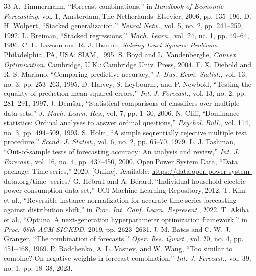 \documentclass[journal]{IEEEtran}
\begin{document}
\begin{thebibliography}{33}
 A. Timmermann, ``Forecast combinations,'' in \emph{Handbook of Economic Forecasting}, vol. 1, Amsterdam, The Netherlands: Elsevier, 2006, pp. 135--196.
 D. H. Wolpert, ``Stacked generalization,'' \emph{Neural Netw.}, vol. 5, no. 2, pp. 241--259, 1992.
 L. Breiman, ``Stacked regressions,'' \emph{Mach. Learn.}, vol. 24, no. 1, pp. 49--64, 1996.
 C. L. Lawson and R. J. Hanson, \emph{Solving Least Squares Problems}. Philadelphia, PA, USA: SIAM, 1995.
 S. Boyd and L. Vandenberghe, \emph{Convex Optimization}. Cambridge, U.K.: Cambridge Univ. Press, 2004.
 F. X. Diebold and R. S. Mariano, ``Comparing predictive accuracy,'' \emph{J. Bus. Econ. Statist.}, vol. 13, no. 3, pp. 253--263, 1995.
 D. Harvey, S. Leybourne, and P. Newbold, ``Testing the equality of prediction mean squared errors,'' \emph{Int. J. Forecast.}, vol. 13, no. 2, pp. 281--291, 1997.
 J. Dem\v{s}ar, ``Statistical comparisons of classifiers over multiple data sets,'' \emph{J. Mach. Learn. Res.}, vol. 7, pp. 1--30, 2006.
 N. Cliff, ``Dominance statistics: Ordinal analyses to answer ordinal questions,'' \emph{Psychol. Bull.}, vol. 114, no. 3, pp. 494--509, 1993.
 S. Holm, ``A simple sequentially rejective multiple test procedure,'' \emph{Scand. J. Statist.}, vol. 6, no. 2, pp. 65--70, 1979.
 L. J. Tashman, ``Out-of-sample tests of forecasting accuracy: An analysis and review,'' \emph{Int. J. Forecast.}, vol. 16, no. 4, pp. 437--450, 2000.
 Open Power System Data, ``Data package: Time series,'' 2020. [Online]. Available: \url{https://data.open-power-system-data.org/time_series/}
 G. H\'ebrail and A. B\'erard, ``Individual household electric power consumption data set,'' UCI Machine Learning Repository, 2012.
 T. Kim et al., ``Reversible instance normalization for accurate time-series forecasting against distribution shift,'' in \emph{Proc. Int. Conf. Learn. Represent.}, 2022.
 T. Akiba et al., ``Optuna: A next-generation hyperparameter optimization framework,'' in \emph{Proc. 25th ACM SIGKDD}, 2019, pp. 2623--2631.
 J. M. Bates and C. W. J. Granger, ``The combination of forecasts,'' \emph{Oper. Res. Quart.}, vol. 20, no. 4, pp. 451--468, 1969.
 P. Radchenko, A. L. Vasnev, and W. Wang, ``Too similar to combine? On negative weights in forecast combination,'' \emph{Int. J. Forecast.}, vol. 39, no. 1, pp. 18--38, 2023.
\end{thebibliography}
\end{document}
